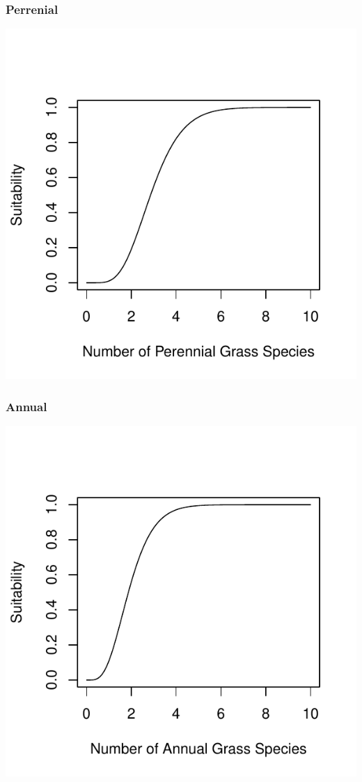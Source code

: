 \documentclass[12pt,letterpaper]{article}\usepackage{graphicx, color}
\makeatletter
\def\maxwidth{ %
  \ifdim\Gin@nat@width>\linewidth
    \linewidth
  \else
    \Gin@nat@width
  \fi
}
\newenvironment{knitrout}{}{} %
\makeatother
\begin{document}
\subsubsection{Perrenial}
\begin{knitrout}
\color{fgcolor}\includegraphics[width=\maxwidth]{figure/Sally-Dan_Grass_Diversity_p} 
\end{knitrout}

\subsubsection{Annual}
\begin{knitrout}
\color{fgcolor}\includegraphics[width=\maxwidth]{figure/Sally-Dan_Grass_Diversity_a} 
\end{knitrout}
\end{document}
